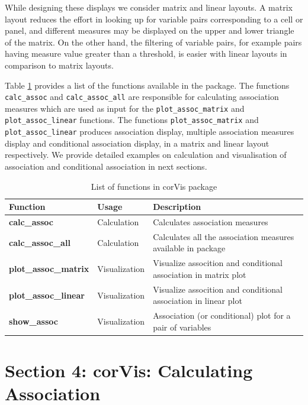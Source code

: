 While designing these displays we consider matrix and linear layouts. A
matrix layout reduces the effort in looking up for variable pairs
corresponding to a cell or panel, and different measures may be
displayed on the upper and lower triangle of the matrix. On the other
hand, the filtering of variable pairs, for example pairs having measure
value greater than a threshold, is easier with linear layouts in
comparison to matrix layouts.

Table \ref{tab:function-corVis} provides a list of the functions
available in the package. The functions \texttt{calc\_assoc} and
\texttt{calc\_assoc\_all} are responsible for calculating association
measures which are used as input for the \texttt{plot\_assoc\_matrix}
and \texttt{plot\_assoc\_linear} functions. The functions
\texttt{plot\_assoc\_matrix} and \texttt{plot\_assoc\_linear} produces
association display, multiple association measures display and
conditional association display, in a matrix and linear layout
respectively. We provide detailed examples on calculation and
visualisation of association and conditional association in next
sections.

\begin{Schunk}
\begin{table}

\caption{\label{tab:function-corVis}List of functions in corVis package}
\centering
\begin{tabular}[t]{>{}lll}
\toprule
Function & Usage & Description\\
\midrule
\textbf{calc\_assoc} & Calculation & Calculates association measures\\
\textbf{calc\_assoc\_all} & Calculation & Calculates all the association measures available in package\\
\textbf{plot\_assoc\_matrix} & Visualization & Visualize assocition and conditional association in matrix plot\\
\textbf{plot\_assoc\_linear} & Visualization & Visualize assocition and conditional association in linear plot\\
\textbf{show\_assoc} & Visualization & Association (or conditional) plot for a pair of variables\\
\bottomrule
\end{tabular}
\end{table}

\end{Schunk}

\hypertarget{section-4-corvis-calculating-association}{%
\section{Section 4: corVis: Calculating
Association}\label{section-4-corvis-calculating-association}}

